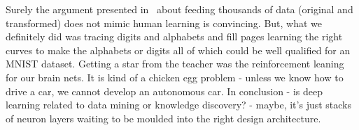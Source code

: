 \documentclass[10pt]{article}
\begin{document}
\par Surely the argument presented in~\cite{khurshudov2015suddenly} about feeding thousands of data (original and transformed) does not mimic human learning is convincing. But, what we definitely did was tracing digits and alphabets and fill pages  learning the right curves to make the alphabets or digits all of which could be well qualified for an MNIST dataset. Getting a star from the teacher was the reinforcement leaning for our brain nets. It is kind of a chicken egg problem - unless we know how to drive a car, we cannot develop an autonomous car. In conclusion - is deep learning related to data mining or knowledge discovery? - maybe, it's just stacks of neuron layers waiting to be moulded into the right design architecture.  



\end{document}
